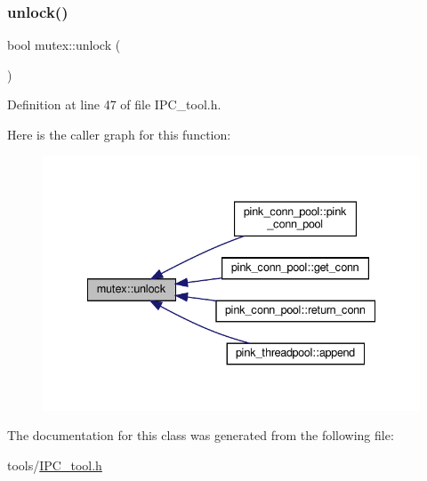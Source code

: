 \subsubsection{\texorpdfstring{unlock()}{unlock()}}
{\footnotesize\ttfamily bool mutex\+::unlock (\begin{DoxyParamCaption}{ }\end{DoxyParamCaption})\hspace{0.3cm}{\ttfamily [inline]}}



Definition at line 47 of file I\+P\+C\+\_\+tool.\+h.

Here is the caller graph for this function\+:\nopagebreak
\begin{figure}[H]
\begin{center}
\leavevmode
\includegraphics[width=335pt]{classmutex_a47bc4d60f08056af411b57e321959fe1_icgraph}
\end{center}
\end{figure}


The documentation for this class was generated from the following file\+:\begin{DoxyCompactItemize}
\item 
tools/\hyperlink{_i_p_c__tool_8h}{I\+P\+C\+\_\+tool.\+h}\end{DoxyCompactItemize}
